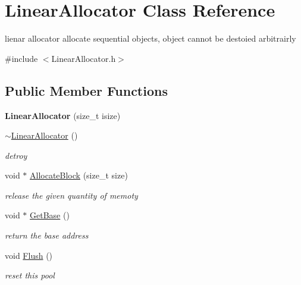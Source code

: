 \hypertarget{class_linear_allocator}{\section{Linear\-Allocator Class Reference}
\label{class_linear_allocator}
}


lienar allocator allocate sequential objects, object cannot be destoied arbitrairly  




{\ttfamily \#include $<$Linear\-Allocator.\-h$>$}

\subsection*{Public Member Functions}
\begin{DoxyCompactItemize}
\item 
\hypertarget{class_linear_allocator_a97790aabb77733b7d92391e889ad002a}{{\bfseries Linear\-Allocator} (size\-\_\-t isize)}\label{class_linear_allocator_a97790aabb77733b7d92391e889ad002a}

\item 
\hypertarget{class_linear_allocator_a2a9dbeeec28bfd75d74cc66ffee80296}{\hyperlink{class_linear_allocator_a2a9dbeeec28bfd75d74cc66ffee80296}{$\sim$\-Linear\-Allocator} ()}\label{class_linear_allocator_a2a9dbeeec28bfd75d74cc66ffee80296}

\begin{DoxyCompactList}\small\item\em detroy \end{DoxyCompactList}\item 
\hypertarget{class_linear_allocator_a99250c0035531a1221dfd9a5d1920aff}{void $\ast$ \hyperlink{class_linear_allocator_a99250c0035531a1221dfd9a5d1920aff}{Allocate\-Block} (size\-\_\-t size)}\label{class_linear_allocator_a99250c0035531a1221dfd9a5d1920aff}

\begin{DoxyCompactList}\small\item\em release the given quantity of memoty \end{DoxyCompactList}\item 
\hypertarget{class_linear_allocator_a69f6e560e46416d2956c93ac4e8d869d}{void $\ast$ \hyperlink{class_linear_allocator_a69f6e560e46416d2956c93ac4e8d869d}{Get\-Base} ()}\label{class_linear_allocator_a69f6e560e46416d2956c93ac4e8d869d}

\begin{DoxyCompactList}\small\item\em return the base address \end{DoxyCompactList}\item 
\hypertarget{class_linear_allocator_af7e16b7db3d692ebb8b877c22babd453}{void \hyperlink{class_linear_allocator_af7e16b7db3d692ebb8b877c22babd453}{Flush} ()}\label{class_linear_allocator_af7e16b7db3d692ebb8b877c22babd453}

\begin{DoxyCompactList}\small\item\em reset this pool \end{DoxyCompactList}\end{DoxyCompactItemize}


